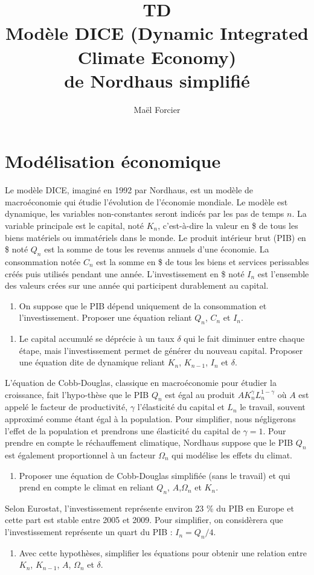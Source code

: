 \documentclass[12pt]{article}
\title{TD \\Modèle 
DICE (Dynamic Integrated Climate Economy) \\
de Nordhaus simplifié }
\author{Maël Forcier}
\newcommand{\ques}[1]{\begin{enumerate}[resume]
\item  #1
\end{enumerate}}
\newcommand{\rep}[1]{\textit{Réponse :} #1 \\}
\renewcommand{\rep}[1]{ }
\theoremstyle{remark}
\begin{document}
\maketitle


\section{Modélisation économique}

Le modèle DICE, imaginé en 1992 par Nordhaus, est un modèle de macroéconomie qui étudie l'évolution de l'économie mondiale.
Le modèle est dynamique, les variables non-constantes seront indicés par les pas de temps $n$.
La variable principale est le capital, noté $K_n$, c'est-à-dire la valeur en \$ de tous les biens matériels ou immatériels dans le monde.
Le produit intérieur brut (PIB) en \$ noté $Q_n$ est la somme de tous les revenus annuels d'une économie.
La consommation notée $C_n$ est la somme en \$ de tous les biens et services perissables créés puis utilisés pendant une année.
L'investissement en \$ noté $I_n$ est l'ensemble des valeurs crées sur une année qui participent durablement au capital.

\begin{enumerate}
\item On suppose que le PIB dépend uniquement de la consommation et l'investissement. Proposer une équation reliant $Q_n$, $C_n$ et $I_n$.
\end{enumerate}
\rep{ $Q_{n}=C_n + I_n$ }
\begin{enumerate}[resume]
\item  Le capital accumulé se déprécie à un taux $\delta$ qui le fait diminuer entre chaque étape, mais l'investissement permet de générer du nouveau capital. Proposer une équation dite de dynamique reliant $K_{n}$, $K_{n-1}$, $I_n$ et $\delta$.
\end{enumerate}
\rep{ $K_{n}=(1-\delta)K_{n-1}+I_n$ }

L'équation de Cobb-Douglas, classique en macroéconomie pour étudier la croissance, fait l'hypo-thèse que le PIB $Q_n$ est égal au produit $AK_n^\gamma L_n^{1-\gamma}$ où $A$ est appelé le facteur de productivité, $\gamma$ l'élasticité du capital et $L_n$ le travail, souvent approximé comme étant égal à la population. Pour simplifier, nous négligerons l'effet de la population et prendrons une élasticité du capital de $\gamma=1$. Pour prendre en compte le réchauffement climatique, Nordhaus suppose que le PIB $Q_n$ est également proportionnel à un facteur $\Omega_n$ qui modélise les effets du climat. 
\ques{  Proposer une équation de Cobb-Douglas simplifiée (sans le travail) et qui prend en compte le climat en reliant $Q_{n}$, $A$,$\Omega_n$ et $K_{n}$.
}
\rep{ $Q_{n}=A \Omega_n K_n$ }
Selon Eurostat, l'investissement représente environ 23 \% du PIB en Europe et cette part est stable entre 2005 et 2009. Pour simplifier, on considèrera que l'investissement représente un quart du PIB : $I_n=Q_n/4$.
\ques{Avec cette hypothèses, simplifier les équations pour obtenir une relation entre $K_n$, $K_{n-1}$, $A$, $\Omega_n$ et $\delta$. \label{ques:dynamique_K_1}}
\rep{\begin{equation*} K_n=\frac{1- \delta}{1- \frac{A\Omega_n}{4}} K_{n-1}\end{equation*}}
\end{document}
